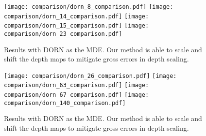 \begin{figure}[H]
  \texttt{[image: comparison/dorn\_8\_comparison.pdf]}
  \texttt{[image: comparison/dorn\_14\_comparison.pdf]}
  \texttt{[image: comparison/dorn\_15\_comparison.pdf]}
  \texttt{[image: comparison/dorn\_23\_comparison.pdf]}
  \caption{Results with DORN as the MDE. Our method is able to scale and shift
    the depth maps to mitigate gross errors in depth scaling.}
  \label{fig:dorn_1}
\end{figure}
\begin{figure}[H]
  \texttt{[image: comparison/dorn\_26\_comparison.pdf]}
  \texttt{[image: comparison/dorn\_63\_comparison.pdf]}
  \texttt{[image: comparison/dorn\_67\_comparison.pdf]}
  \texttt{[image: comparison/dorn\_140\_comparison.pdf]}
  \caption{Results with DORN as the MDE. Our method is able to scale and shift
    the depth maps to mitigate gross errors in depth scaling.}
  \label{fig:dorn_2}
\end{figure}
